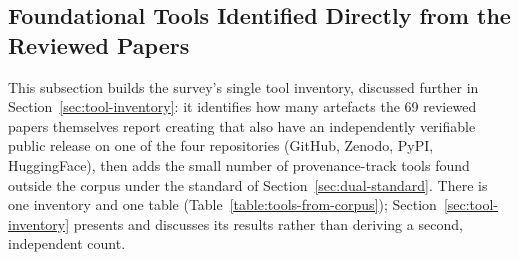 \documentclass[sn-mathphys-num]{sn-jnl}
\theoremstyle{thmstyleone}
\theoremstyle{thmstyletwo}
\theoremstyle{thmstylethree}
\begin{document}
\subsection{Foundational Tools Identified Directly from the Reviewed Papers}\label{sec:tools-from-corpus}

This subsection builds the survey's single tool inventory, discussed further in Section~\ref{sec:tool-inventory}: it identifies how many artefacts the 69 reviewed papers themselves report creating that also have an independently verifiable public release on one of the four repositories (GitHub, Zenodo, PyPI, HuggingFace), then adds the small number of provenance-track tools found outside the corpus under the standard of Section~\ref{sec:dual-standard}. There is one inventory and one table (Table~\ref{table:tools-from-corpus}); Section~\ref{sec:tool-inventory} presents and discusses its results rather than deriving a second, independent count.
\end{document}
